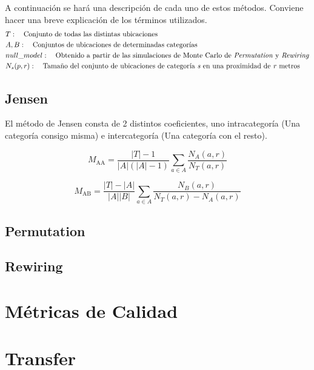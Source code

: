 A continuación se hará una descripción de cada uno de estos métodos. Conviene hacer una
breve explicación de los términos utilizados.
\begin{align*}
	& T: \quad \text{Conjunto de todas las distintas ubicaciones} \\
	& A,B: \quad \text{Conjuntos de ubicaciones de determinadas categorías}\\
	& null\_model: \quad \text{Obtenido a partir de las simulaciones de Monte Carlo de \textit{Permutation} y  
		\textit{Rewiring}} \\
	& N_s(p,r): \quad \text{Tamaño del conjunto de ubicaciones de categoría \textit{s} en una proximidad de \textit{r} metros }
\end{align*}

\subsection{Jensen}
El método de Jensen consta de 2 distintos coeficientes, uno intracategoría (Una categoría consigo misma) e intercategoría (Una categoría con el resto).

\begin{equation*}
	M_\text{AA} = \frac{|T| - 1}{|A|(|A|-1)} \sum_{a \in A}\frac{N_A(a,r)}{N_T(a,r)}
\end{equation*}

\begin{equation*}
	M_\text{AB} = \frac{|T| - |A|}{|A||B|} \sum_{a \in A}\frac{N_B(a,r)}{N_T(a,r) - N_A(a,r)}
\end{equation*}

\subsection{Permutation}


\subsection{Rewiring}


\section{Métricas de Calidad}

\section{Transfer}

